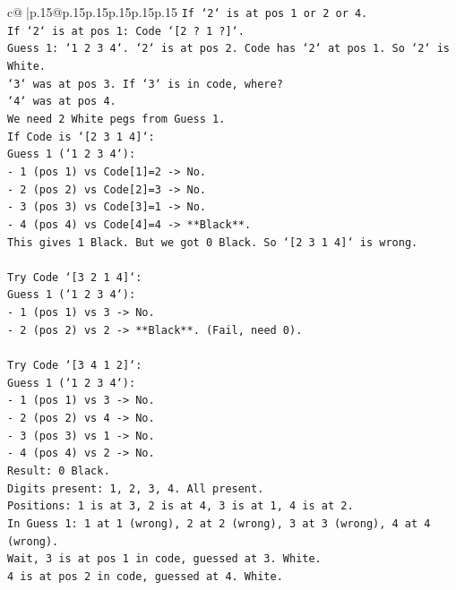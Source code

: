 \documentclass{article}
\begin{document}
{\begin{supertabular}{c@{$\;$}|p{.15\linewidth}@{}p{.15\linewidth}p{.15\linewidth}p{.15\linewidth}p{.15\linewidth}p{.15\linewidth}}
{{{\texttt{If `2` is at pos 1 or 2 or 4.} \\
\texttt{If `2` is at pos 1: Code `{[}2 ? 1 ?{]}`.} \\
\texttt{Guess 1: `1 2 3 4`. `2` is at pos 2. Code has `2` at pos 1. So `2` is White.} \\
\texttt{`3` was at pos 3. If `3` is in code, where?} \\
\texttt{`4` was at pos 4.} \\
\texttt{We need 2 White pegs from Guess 1.} \\
\texttt{If Code is `{[}2 3 1 4{]}`:} \\
\texttt{Guess 1 (`1 2 3 4`):} \\
\texttt{{-} 1 (pos 1) vs Code{[}1{]}=2 {-}> No.} \\
\texttt{{-} 2 (pos 2) vs Code{[}2{]}=3 {-}> No.} \\
\texttt{{-} 3 (pos 3) vs Code{[}3{]}=1 {-}> No.} \\
\texttt{{-} 4 (pos 4) vs Code{[}4{]}=4 {-}> **Black**.} \\
\texttt{This gives 1 Black. But we got 0 Black. So `{[}2 3 1 4{]}` is wrong.} \\
\\ 
\texttt{Try Code `{[}3 2 1 4{]}`:} \\
\texttt{Guess 1 (`1 2 3 4`):} \\
\texttt{{-} 1 (pos 1) vs 3 {-}> No.} \\
\texttt{{-} 2 (pos 2) vs 2 {-}> **Black**. (Fail, need 0).} \\
\\ 
\texttt{Try Code `{[}3 4 1 2{]}`:} \\
\texttt{Guess 1 (`1 2 3 4`):} \\
\texttt{{-} 1 (pos 1) vs 3 {-}> No.} \\
\texttt{{-} 2 (pos 2) vs 4 {-}> No.} \\
\texttt{{-} 3 (pos 3) vs 1 {-}> No.} \\
\texttt{{-} 4 (pos 4) vs 2 {-}> No.} \\
\texttt{Result: 0 Black.} \\
\texttt{Digits present: 1, 2, 3, 4. All present.} \\
\texttt{Positions: 1 is at 3, 2 is at 4, 3 is at 1, 4 is at 2.} \\
\texttt{In Guess 1: 1 at 1 (wrong), 2 at 2 (wrong), 3 at 3 (wrong), 4 at 4 (wrong).} \\
\texttt{Wait, 3 is at pos 1 in code, guessed at 3. White.} \\
\texttt{4 is at pos 2 in code, guessed at 4. White.} \\
}}}
\end{supertabular}}
\end{document}
